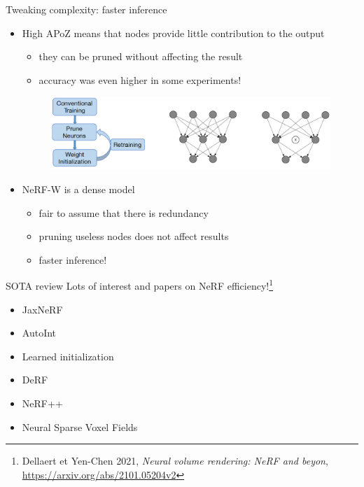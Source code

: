 \documentclass[aspectratio=1610]{beamer}
\begin{document}
\begin{frame}{Tweaking complexity: faster inference}
    \begin{itemize}
        \item High APoZ means that nodes provide little contribution to the output
        \begin{itemize}
            \item they can be pruned without affecting the result
            \item accuracy was even higher in some experiments!
        \end{itemize}
        \bigskip
        \pause
        \begin{figure}
            \includegraphics[width=.75\textwidth]{retrain.png}
        \end{figure}
        \bigskip
        \pause
        \item NeRF-W is a dense model
        \begin{itemize}
            \item fair to assume that there is redundancy
            \item pruning useless nodes does not affect results
            \item faster inference!
        \end{itemize}
    \end{itemize}
\end{frame}

\begin{frame}{SOTA review}
    Lots of interest and papers on NeRF efficiency!\footnote{Dellaert et Yen-Chen 2021, \emph{Neural volume rendering: NeRF and beyon}, \url{https://arxiv.org/abs/2101.05204v2}}
    \bigskip
    \begin{itemize}
        \item JaxNeRF
        \item AutoInt
        \item Learned initialization
        \item DeRF
        \item NeRF++
        \item Neural Sparse Voxel Fields
    \end{itemize}
\end{frame}
\end{document}
